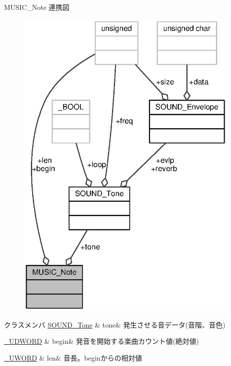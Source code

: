 M\+U\+S\+I\+C\+\_\+\+Note 連携図
\nopagebreak
\begin{figure}[H]
\begin{center}
\leavevmode
\includegraphics[width=309pt]{de/d9f/structMUSIC__Note__coll__graph}
\end{center}
\end{figure}
\begin{DoxyFields}{クラスメンバ}
\hyperlink{sound_8h_d6/d3c/structSOUND__Tone}{S\+O\+U\+N\+D\+\_\+\+Tone}\label{music_8h_aea1e6d760788604e27607df5396e84af}
&
tone&
発生させる音データ(音階、音色) \\
\hline

\hyperlink{stddef_8h_a1fd04328ad1e5a3e83788b99cddc35dd_a1fd04328ad1e5a3e83788b99cddc35dd}{\+\_\+\+U\+D\+W\+O\+R\+D}\label{music_8h_a35d44582fe88f2d916ddca02f8b17a6b}
&
begin&
発音を開始する楽曲カウント値(絶対値) \\
\hline

\hyperlink{stddef_8h_af4b45f5ec97da370bd2173b4fe891d76_af4b45f5ec97da370bd2173b4fe891d76}{\+\_\+\+U\+W\+O\+R\+D}\label{music_8h_a3c43ff3e1874869792634760dd25e495}
&
len&
音長。beginからの相対値 \\
\hline

\end{DoxyFields}
\label{structMUSIC__Part}
